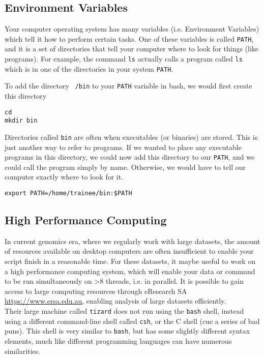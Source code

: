 \subsection{Environment Variables}
\begin{information}
Your computer operating system has many variables (i.e. Environment Variables) which tell it how to perform certain tasks.
One of these variables is called \texttt{PATH}, and it is a set of directories that tell your computer where to look for things (like programs).
For example, the command \texttt{ls} actually calls a program called \texttt{ls} which is in one of the directories in your system \texttt{PATH}.\\
\end{information}

\begin{steps}
To add the directory \texttt{~/bin} to your \texttt{PATH} variable in bash, we would first create this directory
\begin{lstlisting}
cd
mkdir bin
\end{lstlisting}
\end{steps}

\begin{steps}
Directories called \texttt{bin} are often when executables (or binaries) are stored.
This is just another way to refer to programs.
If we wanted to place any executable programs in this directory, we could now add this directory to our \texttt{PATH}, and we could call the program simply by name.
Otherwise, we would have to tell our computer exactly where to look for it.

\begin{lstlisting}
export PATH=/home/trainee/bin:$PATH
\end{lstlisting}
\end{steps}

\subsection{High Performance Computing}
\begin{information}
In current genomics era, where we regularly work with large datasets, the amount of resources available on desktop computers are often insufficient to enable your script finish in a reasonable time. 
For these datasets, it maybe useful to work on a high performance computing system, which will enable your data or command to be run simultaneously on >8 threads, i.e. in parallel.
It is possible to gain access to large computing resources through eResearch SA \url{https://www.ersa.edu.au}, enabling analysis of large datasets efficiently.\\ 

Their large machine called \texttt{tizard} does not run using the \texttt{bash} shell, instead using a different command-line shell called \texttt{csh}, or the C shell (cue a series of bad puns).
This shell is very similar to \texttt{bash}, but has some slightly different syntax elements, much like different programming languages can have numerous similarities.\\
\end{information}

